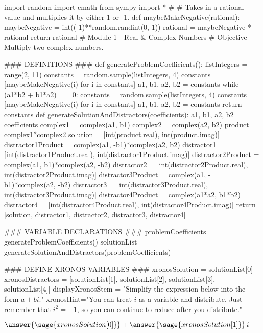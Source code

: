 \documentclass{ximera}
\begin{document}
\begin{sagesilent}
import random
import cmath
from sympy import *
#
# Takes in a rational value and multiplies it by either 1 or -1.
def maybeMakeNegative(rational):
    maybeNegative = int((-1)**random.randint(0, 1))
    rational = maybeNegative * rational
    return rational
# Module 1 - Real & Complex Numbers
# Objective - Multiply two complex numbers.

### DEFINITIONS ###
def generateProblemCoefficients():
    listIntegers = range(2, 11)
    constants = random.sample(listIntegers, 4)
    constants = [maybeMakeNegative(i) for i in constants]
    a1, b1, a2, b2 = constants
    while (a1*b2 + b1*a2) == 0:
        constants = random.sample(listIntegers, 4)
        constants = [maybeMakeNegative(i) for i in constants]
        a1, b1, a2, b2 = constants
    return constants
def generateSolutionAndDistractors(coefficients):
    a1, b1, a2, b2 = coefficients
    complex1 = complex(a1, b1)
    complex2 = complex(a2, b2)
    product = complex1*complex2
    solution = [int(product.real), int(product.imag)]
    distractor1Product = complex(a1, -b1)*complex(a2, b2)
    distractor1 = [int(distractor1Product.real), int(distractor1Product.imag)]
    distractor2Product = complex(a1, b1)*complex(a2, -b2)
    distractor2 = [int(distractor2Product.real), int(distractor2Product.imag)]
    distractor3Product = complex(a1, -b1)*complex(a2, -b2)
    distractor3 = [int(distractor3Product.real), int(distractor3Product.imag)]
    distractor4Product = complex(a1*a2, b1*b2)
    distractor4 = [int(distractor4Product.real), int(distractor4Product.imag)]
    return [solution, distractor1, distractor2, distractor3, distractor4]

### VARIABLE DECLARATIONS ###
problemCoefficients = generateProblemCoefficients()
solutionList = generateSolutionAndDistractors(problemCoefficients)

### DEFINE XRONOS VARIABLES ###
xronosSolution = solutionList[0]
xronosDistractors = [solutionList[1], solutionList[2], solutionList[3], solutionList[4]]
displayXronosStem = "Simplify the expression below into the form $a+bi$."
xronosHint="You can treat $i$ as a variable and distribute. Just remember that $i^2=-1$, so you can continue to reduce after you distribute."
\end{sagesilent}

\begin{exercise}


$\answer{\sage{xronosSolution[0]}} + \answer{\sage{xronosSolution[1]}} \, i$

\begin{hint}
\end{hint}
\end{exercise}
\end{document}
